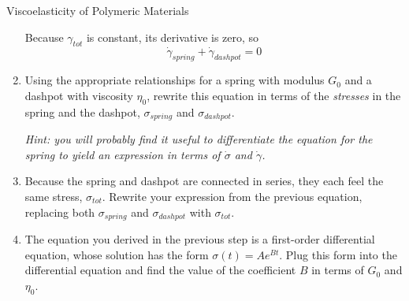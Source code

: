 \begin{activity}{Viscoelasticity of Polymeric Materials}
\begin{exercises}
\begin{enumerate}
\begin{solution}
{						Because $\gamma_{tot}$ is constant, its derivative is zero, so
						\begin{equation*}
							\dot\gamma_{spring} + \dot\gamma_{dashpot} = 0
						\end{equation*}
					}\end{solution}
				
				\item Using the appropriate relationships for a spring with modulus $G_0$ and a dashpot with viscosity $\eta_0$, rewrite this equation in terms of the \emph{stresses} in the spring and the dashpot, $\sigma_{spring}$ and $\sigma_{dashpot}$.
				
					\emph{Hint: you will probably find it useful to differentiate the equation for the spring to yield an expression in terms of $\dot\sigma$ and $\dot\gamma$.}
				
					\begin{solution}\end{solution}
					
				\item Because the spring and dashpot are connected in series, they each feel the same stress, $\sigma_{tot}$.  Rewrite your expression from the previous equation, replacing both $\sigma_{spring}$ and $\sigma_{dashpot}$ with $\sigma_{tot}$.
				
					\begin{solution}\end{solution}			
				
				
				\item The equation you derived in the previous step is a first-order differential equation, whose solution has the form $\sigma(t) = A e^{Bt}$.  Plug this form into the differential equation and find the value of the coefficient $B$ in terms of $G_0$ and $\eta_0$.
				

\end{enumerate}
\end{exercises}
\end{activity}
